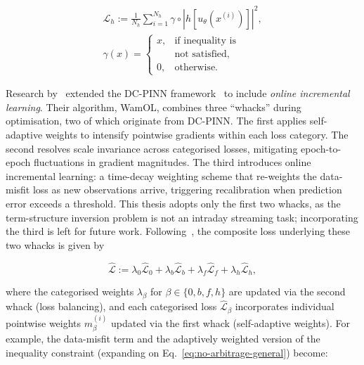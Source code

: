 \documentclass[sigconf, authorversion=true, nonacm=true]{acmart}
\begin{document}
\begin{equation} \label{eq:no-arbitrage-general}
\begin{gathered}
    \mathcal{L}_h := \frac{1}{N_h}\sum_{i=1}^{N_h} \gamma \circ \left|h\left[u_\theta(x^{(i)})\right]\right|^2, \\
    \gamma(x) = \begin{cases} x, & \text{if inequality is} \\ & \text{not satisfied,} \\ 0, & \text{otherwise.} \end{cases}
\end{gathered}
\end{equation}

Research by~\cite{Hoshisashi2024Whack-a-moleSurface} extended the DC-PINN framework~\cite{Hoshisashi2024Physics-InformedPDEs} to include \textit{online incremental learning}. Their algorithm, WamOL, combines three ``whacks'' during optimisation, two of which originate from DC-PINN. The first applies self-adaptive weights to intensify pointwise gradients within each loss category. The second resolves scale invariance across categorised losses, mitigating epoch-to-epoch fluctuations in gradient magnitudes. The third introduces online incremental learning: a time-decay weighting scheme that re-weights the data-misfit loss as new observations arrive, triggering recalibration when prediction error exceeds a threshold. This thesis adopts only the first two whacks, as the term-structure inversion problem is not an intraday streaming task; incorporating the third is left for future work. Following~\cite{Hoshisashi2024Physics-InformedPDEs}, the composite loss underlying these two whacks is given by

\begin{equation}
    \hat{\mathcal{L}} := \lambda_0 \hat{\mathcal{L}}_0 + \lambda_b \hat{\mathcal{L}}_b + \lambda_f \hat{\mathcal{L}}_f + \lambda_h \hat{\mathcal{L}}_h,
    \label{eq:dcpinn-composite}
\end{equation}

where the categorised weights $\lambda_\beta$ for $\beta \in \{0, b, f, h\}$ are updated via the second whack (loss balancing), and each categorised loss $\hat{\mathcal{L}}_\beta$ incorporates individual pointwise weights $m_\beta^{(i)}$ updated via the first whack (self-adaptive weights). For example, the data-misfit term and the adaptively weighted version of the inequality constraint (expanding on Eq.~\ref{eq:no-arbitrage-general}) become:
\end{document}
